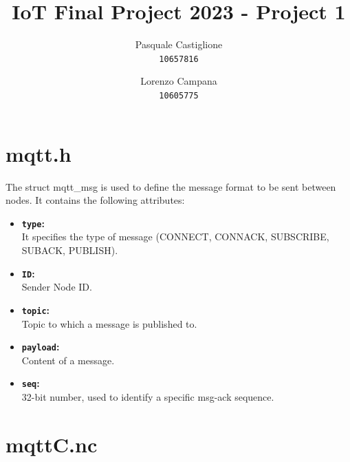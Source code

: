 \documentclass[11pt]{article}
\title{\textbf{IoT Final Project 2023 - Project 1}}
\author{
  Pasquale Castiglione\\
	\texttt{10657816}
  \and
  Lorenzo Campana\\
  \texttt{10605775}
}
\date{}
\begin{document}
\maketitle
\section*{mqtt.h}
The struct mqtt\_msg is used to define the message format to be sent between nodes. It contains the following attributes:
\begin{itemize}
\item \textbf{\texttt{type}:}\\
It specifies the type of message (CONNECT, CONNACK, SUBSCRIBE, SUBACK, PUBLISH).
\item \textbf{\texttt{ID}:}\\
Sender Node ID.
\item \textbf{\texttt{topic}:}\\
Topic to which a message is published to.
\item \textbf{\texttt{payload}:}\\
Content of a message.
\item \textbf{\texttt{seq}:}\\
32-bit number, used to identify a specific msg-ack sequence.
\end{itemize}

\section*{mqttC.nc}
\end{document}

